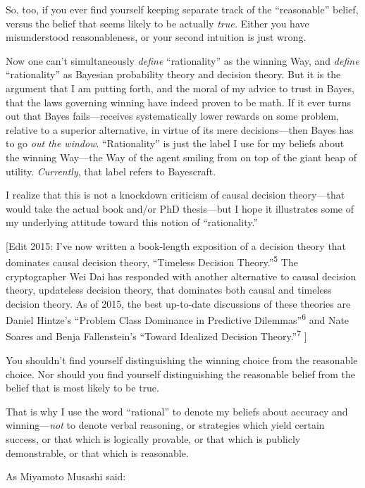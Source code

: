 {
 So, too, if you ever find yourself keeping separate track of the
``reasonable'' belief, versus the
belief that seems likely to be actually \textit{true.} Either you have
misunderstood reasonableness, or your second intuition is just wrong.}

{
 Now one can't simultaneously \textit{define}
``rationality'' as the winning Way,
and \textit{define} ``rationality''
as Bayesian probability theory and decision theory. But it is the
argument that I am putting forth, and the moral of my advice to trust
in Bayes, that the laws governing winning have indeed proven to be
math. If it ever turns out that Bayes fails---receives systematically
lower rewards on some problem, relative to a superior alternative, in
virtue of its mere decisions---then Bayes has to go \textit{out the
window}. ``Rationality'' is just the
label I use for my beliefs about the winning Way---the Way of the agent
smiling from on top of the giant heap of utility. \textit{Currently},
that label refers to Bayescraft.}

{
 I realize that this is not a knockdown criticism of causal
decision theory---that would take the actual book and/or PhD
thesis---but I hope it illustrates some of my underlying attitude
toward this notion of
``rationality.''}

{
 [Edit 2015: I've now written a book-length
exposition of a decision theory that dominates causal decision theory,
``Timeless Decision
Theory.''\textsuperscript{5} The cryptographer Wei
Dai has responded with another alternative to causal decision theory,
updateless decision theory, that dominates both causal and timeless
decision theory. As of 2015, the best up-to-date discussions of these
theories are Daniel Hintze's ``Problem
Class Dominance in Predictive
Dilemmas''\textsuperscript{6} and Nate Soares and
Benja Fallenstein's ``Toward Idealized
Decision Theory.''\textsuperscript{7} ]}

{
 You shouldn't find yourself distinguishing the
winning choice from the reasonable choice. Nor should you find yourself
distinguishing the reasonable belief from the belief that is most
likely to be true.}

{
 That is why I use the word
``rational'' to denote my beliefs
about accuracy and winning---\textit{not} to denote verbal reasoning,
or strategies which yield certain success, or that which is logically
provable, or that which is publicly demonstrable, or that which is
reasonable.}

{
 As Miyamoto Musashi said:}

